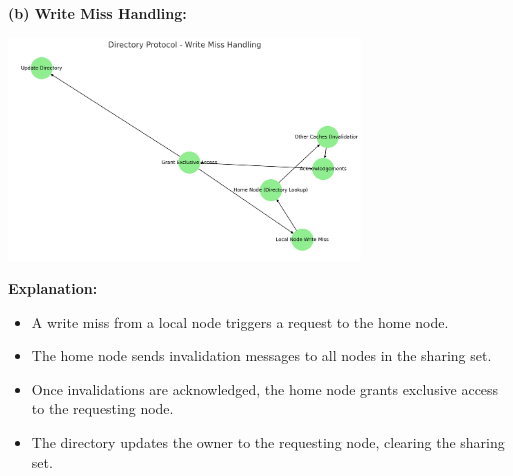 \documentclass[11pt]{article}
\begin{document}
\begin{enumerate}
    \textbf{(b) Write Miss Handling:} \\
    \begin{center}
        \includegraphics[width=0.7\textwidth]{Directory Protocol - Write Miss Handling.png}
    \end{center}
    \textbf{Explanation:}
    \begin{itemize}
        \item A write miss from a local node triggers a request to the home node.
        \item The home node sends invalidation messages to all nodes in the sharing set.
        \item Once invalidations are acknowledged, the home node grants exclusive access to the requesting node.
        \item The directory updates the owner to the requesting node, clearing the sharing set.
    \end{itemize}

\end{enumerate}
\end{document}
